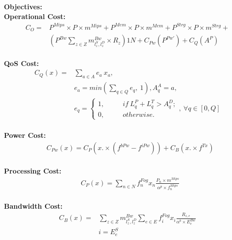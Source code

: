 \documentclass{article}
\begin{document}
\pagebreak

\noindent\textbf{Objectives:}\\[12pt]
\noindent\textbf{Operational Cost:}\\[6pt]
\begin{equation*}
\begin{split}
C_O = & P^{Mips} \times P \times m^{Mips} + P^{Mem} \times P \times m^{Mem} + P^{Strg}\times P\times m^{Strg} + \\
& \left(P^{Bw} \sum_{z\in Z} m^{Bw}_{l^S_z,l^D_z} \times R_z\right)1N + C_{Pw}(P^{Pw'}) + C_{Q}(A^P)
\end{split}
\end{equation*}\\[6pt]

\noindent\textbf{QoS Cost:}\\[6pt]
\begin{equation*}
\begin{aligned}
C_{Q}(x) = & \sum_{a \in A} e_a~ x_a,\\[6pt]
& e_a = min\left(\sum_{q \in Q} e_q,~ 1\right), A^A_q = a,\\[6pt]
& e_q = \left\{
			\begin{array}{ll}
			1, \qquad ~~~ if ~L^P_q + L^T_q > A^D_q;\\[6pt]
			0, \qquad ~~~ otherwise.
			\end{array}
			\right.,~ \forall q \in [0, Q]
\end{aligned}
\end{equation*}\\[6pt]

\noindent\textbf{Power Cost:}\\[6pt]
\begin{equation*}
\begin{aligned}
& C_{Pw}(x) = C_P(x.\times(f^{bPw} - f^{iPw})) + C_B(x.\times f^{Tx})
\end{aligned}
\end{equation*}\\[6pt]

\noindent\textbf{Processing Cost:}\\[6pt]
\begin{equation*}
\begin{aligned}
& C_P(x) = \sum_{n\in N} f^{Fog}_n x_n \frac{P_n \times m^{Mips}}{\alpha^p \times f_n^{Mips}}
\end{aligned}
\end{equation*}\\[6pt]

\noindent\textbf{Bandwidth Cost:}\\[6pt]
\begin{equation*}
\begin{split}
C_B(x) = & \sum_{z\in Z} m^{Bw}_{l^S_z,l^D_z} \sum_{e\in E} f^{Fog}_i x_i \frac{R_{z, e}}{\alpha^b \times E^{Bw}_{e}} \\[6pt]
&i = E^S_e
\end{split}
\end{equation*}\\[6pt]
\end{document}
